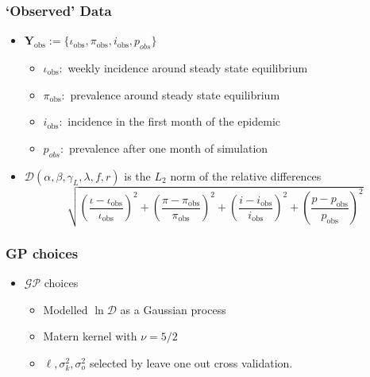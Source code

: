 \documentclass{beamer}
\begin{document}
\begin{frame}
    \frametitle{`Observed' Data}
    \begin{itemize}
        \item $\mathbf{Y}_\text{obs} := \{\iota_\text{obs}, \pi_\text{obs}, i_\text{obs}, p_{obs}\}$
              \begin{itemize}
                  \item $\iota_\text{obs}:$ weekly incidence around steady state equilibrium
                  \item $\pi_\text{obs}:$ prevalence around steady state equilibrium
                  \item $i_\text{obs}:$ incidence in the first month of the epidemic
                  \item $p_{obs}:$ prevalence after one month of simulation
              \end{itemize}
        \item <2-> $
                  \mathcal{D}(\alpha, \beta, \gamma_L, \lambda, f, r)$ is the
              $L_2$ norm of the relative differences
              $$
                  \sqrt{
                      \left(\frac{\iota - \iota_\text{obs}}{\iota_\text{obs}}\right)^2
                      + \left(\frac{\pi - \pi_\text{obs}}{\pi_\text{obs}}\right)^2
                      + \left(\frac{i - i_\text{obs}}{i_\text{obs}}\right)^2
                      + \left(\frac{p - p_\text{obs}}{p_\text{obs}}\right)^2
                  }
              $$
    \end{itemize}
\end{frame}

\begin{frame}
    \frametitle{GP choices}
    \begin{itemize}
        \item $\mathcal{GP}$ choices
              \begin{itemize}
                  \item Modelled $\ln\mathcal{D}$ as a Gaussian process
                  \item Matern kernel with $\nu = 5/2$
                  \item $\ell, \sigma^2_k, \sigma^2_o$ selected by leave
                        one out cross validation.
              \end{itemize}
    \end{itemize}
\end{frame}
\end{document}
